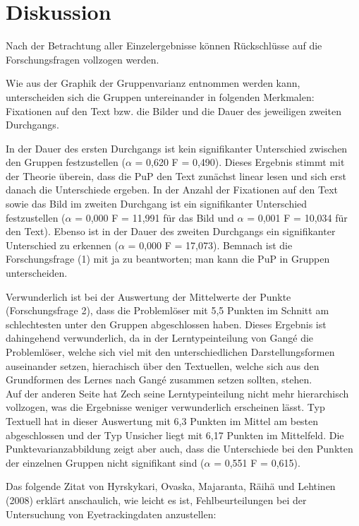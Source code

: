 \chapter{Diskussion}

Nach der Betrachtung aller Einzelergebnisse können Rückschlüsse auf die Forschungsfragen vollzogen werden.  

Wie aus der Graphik der Gruppenvarianz entnommen werden kann, unterscheiden sich die Gruppen untereinander in folgenden Merkmalen: Fixationen auf den Text bzw. die Bilder und die Dauer des jeweiligen zweiten Durchgangs.

In der Dauer des ersten Durchgangs ist kein signifikanter Unterschied zwischen den Gruppen festzustellen ($\alpha$ = 0,620 F = 0,490). Dieses Ergebnis stimmt mit der Theorie überein, dass die \gls{PuP} den Text zunächst linear lesen und sich erst danach die Unterschiede ergeben. In der Anzahl der Fixationen auf den Text sowie das Bild im zweiten Durchgang ist ein signifikanter Unterschied festzustellen ($\alpha$ = 0,000 F = 11,991 für das Bild und $\alpha$ = 0,001 F = 10,034 für den Text). Ebenso ist in der Dauer des zweiten Durchgangs ein signifikanter Unterschied zu erkennen ($\alpha$ = 0,000 F = 17,073). Bemnach ist die Forschungsfrage (1) mit ja zu beantworten; man kann die \gls{PuP} in Gruppen unterscheiden.

Verwunderlich ist bei der Auswertung der Mittelwerte der Punkte (Forschungsfrage 2), dass die Problemlöser mit 5,5 Punkten im Schnitt am schlechtesten unter den Gruppen abgeschlossen haben. Dieses Ergebnis ist dahingehend verwunderlich, da in der Lerntypeinteilung von Gangé die Problemlöser, welche sich viel mit den unterschiedlichen Darstellungsformen auseinander setzen, hierachisch über den Textuellen, welche sich aus den Grundformen des Lernes nach Gangé zusammen setzen sollten, stehen. \\
Auf der anderen Seite hat Zech seine Lerntypeinteilung nicht mehr hierarchisch vollzogen, was die Ergebnisse weniger verwunderlich erscheinen lässt. Typ Textuell hat in dieser Auswertung mit 6,3 Punkten im Mittel am besten abgeschlossen und der Typ Unsicher liegt mit 6,17 Punkten im Mittelfeld. Die Punktevarianzabbildung zeigt aber auch, dass die Unterschiede bei den Punkten der einzelnen Gruppen nicht signifikant sind ($\alpha$ = 0,551 F = 0,615). 

Das folgende Zitat von Hyrskykari, Ovaska, Majaranta, Räihä und Lehtinen (2008) erklärt anschaulich, wie leicht es ist, Fehlbeurteilungen bei der Untersuchung von Eyetrackingdaten anzustellen:

